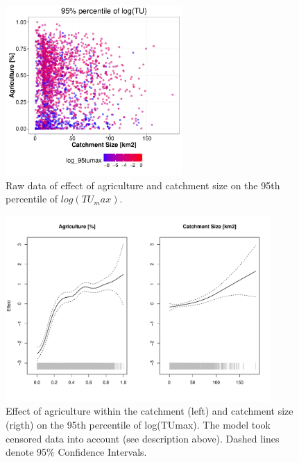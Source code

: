 \documentclass[pdftex,a4paper]{scrreprt}
\begin{document}
\begin{figure}[h]
	\centering
	\includegraphics[width = 0.6\textwidth]{ezgagritu}
	\caption{Raw data of effect of agriculture and catchment size on the 95th percentile of $log(TU_max)$.}
	\label{fig:ezgagritu}
\end{figure}

\begin{figure}[h]
	\centering
	\includegraphics[width = 0.9\textwidth]{ezgagritumodel}
	\caption{Effect of agriculture within the catchment (left) and catchment size (rigth) on the 95th percentile of log(TUmax). The model took censored data into account (see description above). Dashed lines denote 95\% Confidence Intervals.}
	\label{fig:ezgagritumodel}
\end{figure}








\end{document}

